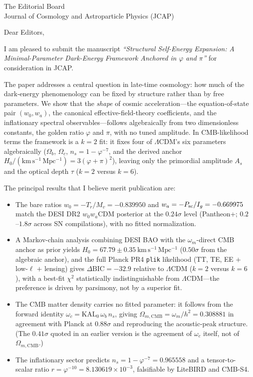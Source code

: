 \documentclass[11pt]{letter}
\begin{document}
\begin{letter}{The Editorial Board\\Journal of Cosmology and Astroparticle Physics (JCAP)}

\opening{Dear Editors,}

I am pleased to submit the manuscript \textit{``Structural Self-Energy
Expansion: A Minimal-Parameter Dark-Energy Framework Anchored in
$\varphi$ and $\pi$''} for consideration in JCAP.

The paper addresses a central question in late-time cosmology: how much of the
dark-energy phenomenology can be fixed by structure rather than by free
parameters. We show that the \emph{shape} of cosmic acceleration---the
equation-of-state pair $(w_0,w_a)$, the canonical effective-field-theory
coefficients, and the inflationary spectral observables---follows algebraically
from two dimensionless constants, the golden ratio $\varphi$ and $\pi$, with no
tuned amplitude. In CMB-likelihood terms the framework is a $k=2$ fit: it fixes
four of $\Lambda$CDM's six parameters algebraically ($\Omega_b$, $\Omega_c$,
$n_s=1-\varphi^{-7}$, and the derived anchor $H_0/(\mathrm{km\,s^{-1}\,Mpc^{-1}})=3(\varphi+\pi)^2$), leaving only
the primordial amplitude $A_s$ and the optical depth $\tau$ ($k=2$ versus $k=6$).

The principal results that I believe merit publication are:

\begin{itemize}
  \item The bare ratios $w_0=-T_r/M_v=-0.839950$ and $w_a=-P_{\rm sc}/I_g=-0.669975$
  match the DESI DR2 $w_0w_a$CDM posterior at the $0.24\sigma$ level (Pantheon+; $0.2$--$1.8\sigma$ across SN compilations), with no
  fitted normalization.
  \item A Markov-chain analysis combining DESI BAO with the $\omega_m$-direct
  CMB anchor as prior yields $H_0=67.79\pm0.35~\mathrm{km\,s^{-1}\,Mpc^{-1}}$
  ($0.50\sigma$ from the algebraic anchor), and the
  full Planck PR4 \texttt{plik} likelihood (TT, TE, EE $+$ low-$\ell$ $+$ lensing)
  gives $\Delta\mathrm{BIC}=-32.9$ relative to $\Lambda$CDM ($k=2$ versus $k=6$),
  with a best-fit $\chi^2$ statistically indistinguishable from $\Lambda$CDM---the
  preference is driven by parsimony, not by a superior fit.
  \item The CMB matter density carries no fitted parameter: it follows from the
  forward identity $\omega_c=\mathrm{KAL}_0\,\omega_b\,n_s$, giving
  $\Omega_{m,\mathrm{CMB}}=\omega_m/h^2=0.308881$ in agreement with Planck at
  $0.88\sigma$ and reproducing the acoustic-peak structure. (The $0.41\sigma$
  quoted in an earlier version is the agreement of $\omega_c$ itself, not of
  $\Omega_{m,\mathrm{CMB}}$.)
  \item The inflationary sector predicts $n_s=1-\varphi^{-7}=0.965558$ and a
  tensor-to-scalar ratio $r=\varphi^{-10}=8.130619\times10^{-3}$, falsifiable by
  LiteBIRD and CMB-S4.
\end{itemize}


\end{letter}
\end{document}
